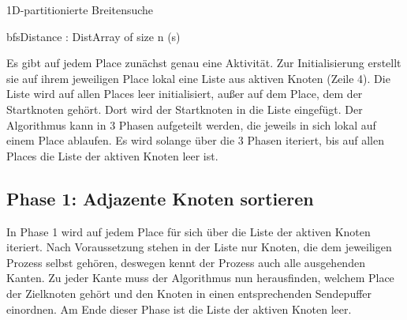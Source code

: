 \begin{algorithm}
	\caption{1D-partitionierte Breitensuche}
	\label{alg:1d_bfs_abstract}
	\begin{algorithmic}[1]
		\State bfsDistance : DistArray of size n 
			(s) 
					\EndFor
				\EndFor

					\EndIf
				\EndFor
			\EndWhile
		\EndFor
	\end{algorithmic}
\end{algorithm}

Es gibt auf jedem Place zunächst genau eine Aktivität. Zur Initialisierung erstellt sie auf ihrem jeweiligen Place lokal eine Liste aus aktiven Knoten (Zeile 4). Die Liste wird auf allen Places leer initialisiert, außer auf dem Place, dem der Startknoten gehört. Dort wird der Startknoten in die Liste eingefügt. Der Algorithmus kann in 3 Phasen aufgeteilt werden, die jeweils in sich lokal auf einem Place ablaufen. Es wird solange über die 3 Phasen iteriert, bis auf allen Places die Liste der aktiven Knoten leer ist.

\subsection{Phase 1: Adjazente Knoten sortieren} %
\label{sub:phase_1}
In Phase 1 wird auf jedem Place für sich über die Liste der aktiven Knoten iteriert. Nach Voraussetzung stehen in der Liste nur Knoten, die dem jeweiligen Prozess selbst gehören, deswegen kennt der Prozess auch alle ausgehenden Kanten. Zu jeder Kante muss der Algorithmus nun herausfinden, welchem Place der Zielknoten gehört und den Knoten in einen entsprechenden Sendepuffer einordnen. Am Ende dieser Phase ist die Liste der aktiven Knoten leer.


